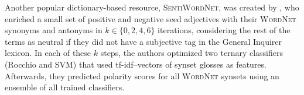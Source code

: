 
Another popular dictionary-based resource, \textsc{SentiWordNet}, was
created by \citet{Esuli:06c}, who enriched a small set of positive and
negative seed adjectives with their \textsc{WordNet} synonyms and
antonyms in $k \in \{0, 2, 4, 6\}$ iterations, considering the rest of
the terms as neutral if they did not have a subjective tag in the
General Inquirer lexicon.  In each of these $k$ steps, the authors
optimized two ternary classifiers (Rocchio and SVM) that used
tf-idf--vectors of synset glosses as features.  Afterwards, they
predicted polarity scores for all \textsc{WordNet} synsets using an
ensemble of all trained classifiers.


